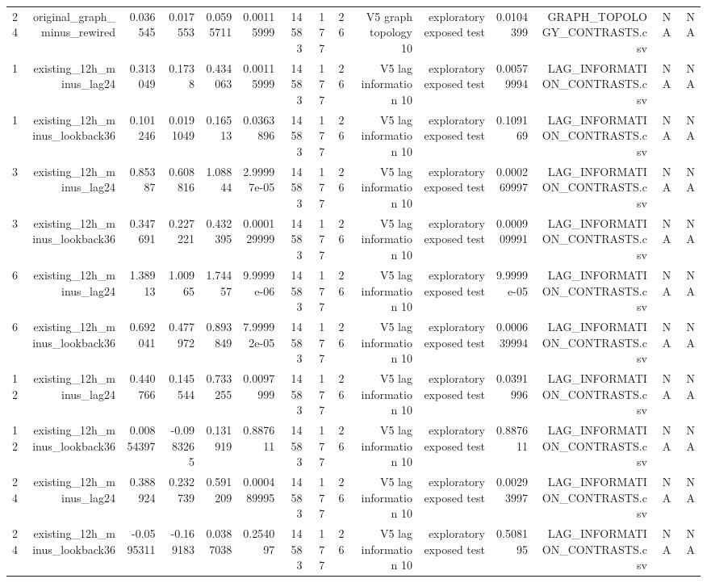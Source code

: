 \begin{tabular}{lrrrrrrrrrrrrrr}
24 & original\_graph\_minus\_rewired & 0.036545 & 0.017553 & 0.0595711 & 0.00115999 & 14583 & 177 & 26 & V5 graph topology 10 & exploratory exposed test & 0.0104399 & GRAPH\_TOPOLOGY\_CONTRASTS.csv & NA & NA \\
1 & existing\_12h\_minus\_lag24 & 0.313049 & 0.1738 & 0.434063 & 0.00115999 & 14583 & 177 & 26 & V5 lag information 10 & exploratory exposed test & 0.00579994 & LAG\_INFORMATION\_CONTRASTS.csv & NA & NA \\
1 & existing\_12h\_minus\_lookback36 & 0.101246 & 0.0191049 & 0.16513 & 0.0363896 & 14583 & 177 & 26 & V5 lag information 10 & exploratory exposed test & 0.109169 & LAG\_INFORMATION\_CONTRASTS.csv & NA & NA \\
3 & existing\_12h\_minus\_lag24 & 0.85387 & 0.608816 & 1.08844 & 2.99997e-05 & 14583 & 177 & 26 & V5 lag information 10 & exploratory exposed test & 0.000269997 & LAG\_INFORMATION\_CONTRASTS.csv & NA & NA \\
3 & existing\_12h\_minus\_lookback36 & 0.347691 & 0.227221 & 0.432395 & 0.000129999 & 14583 & 177 & 26 & V5 lag information 10 & exploratory exposed test & 0.000909991 & LAG\_INFORMATION\_CONTRASTS.csv & NA & NA \\
6 & existing\_12h\_minus\_lag24 & 1.38913 & 1.00965 & 1.74457 & 9.9999e-06 & 14583 & 177 & 26 & V5 lag information 10 & exploratory exposed test & 9.9999e-05 & LAG\_INFORMATION\_CONTRASTS.csv & NA & NA \\
6 & existing\_12h\_minus\_lookback36 & 0.692041 & 0.477972 & 0.893849 & 7.99992e-05 & 14583 & 177 & 26 & V5 lag information 10 & exploratory exposed test & 0.000639994 & LAG\_INFORMATION\_CONTRASTS.csv & NA & NA \\
12 & existing\_12h\_minus\_lag24 & 0.440766 & 0.145544 & 0.733255 & 0.0097999 & 14583 & 177 & 26 & V5 lag information 10 & exploratory exposed test & 0.0391996 & LAG\_INFORMATION\_CONTRASTS.csv & NA & NA \\
12 & existing\_12h\_minus\_lookback36 & 0.00854397 & -0.0983265 & 0.131919 & 0.887611 & 14583 & 177 & 26 & V5 lag information 10 & exploratory exposed test & 0.887611 & LAG\_INFORMATION\_CONTRASTS.csv & NA & NA \\
24 & existing\_12h\_minus\_lag24 & 0.388924 & 0.232739 & 0.591209 & 0.000489995 & 14583 & 177 & 26 & V5 lag information 10 & exploratory exposed test & 0.00293997 & LAG\_INFORMATION\_CONTRASTS.csv & NA & NA \\
24 & existing\_12h\_minus\_lookback36 & -0.0595311 & -0.169183 & 0.0387038 & 0.254097 & 14583 & 177 & 26 & V5 lag information 10 & exploratory exposed test & 0.508195 & LAG\_INFORMATION\_CONTRASTS.csv & NA & NA \\

\end{tabular}

